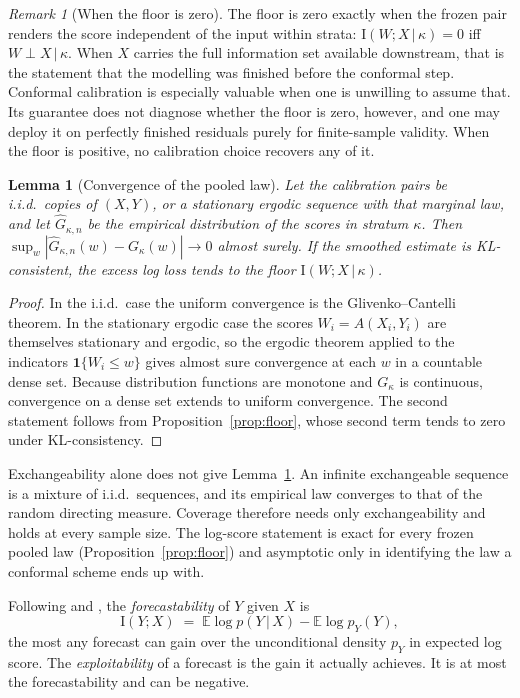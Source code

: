 \documentclass[11pt]{article}
\newtheorem{lemma}[proposition]{Lemma}
\theoremstyle{remark}
\newtheorem{remark}[proposition]{Remark}
\newcommand{\E}{\mathbb{E}}
\newcommand{\I}{\mathrm{I}}
\newcommand{\given}{\,|\,}
\begin{document}
\begin{remark}[When the floor is zero]\label{rem:usecase}
The floor is zero exactly when the frozen pair renders the score independent of
the input within strata: $\I(W;X\given\kappa)=0$ iff $W\perp X\given\kappa$.
When $X$ carries the full information set available downstream, that is the
statement that the modelling was finished before the conformal step. Conformal
calibration is especially valuable when one is unwilling to assume that. Its
guarantee does not diagnose whether the floor is zero, however, and one may deploy
it on perfectly finished residuals purely for finite-sample validity. When the floor is
positive, no calibration choice recovers any of it.
\end{remark}

\begin{lemma}[Convergence of the pooled law]\label{lem:ident}
Let the calibration pairs be i.i.d.\ copies of $(X,Y)$, or a stationary ergodic
sequence with that marginal law, and let $\widehat G_{\kappa,n}$ be the empirical
distribution of the scores in stratum $\kappa$. Then
$\sup_w|\widehat G_{\kappa,n}(w)-G_\kappa(w)|\to0$ almost surely. If the smoothed
estimate is KL-consistent, the excess log loss tends to the floor
$\I(W;X\given\kappa)$.
\end{lemma}

\begin{proof}
In the i.i.d.\ case the uniform convergence is the Glivenko--Cantelli theorem. In
the stationary ergodic case the scores $W_i=A(X_i,Y_i)$ are themselves stationary and
ergodic, so the ergodic theorem applied to the indicators $\mathbf 1\{W_i\le w\}$
gives almost sure convergence at each $w$ in a countable dense set. Because
distribution functions are monotone and $G_\kappa$ is continuous, convergence on a
dense set extends to uniform convergence. The second statement follows from
Proposition~\ref{prop:floor}, whose second term tends to zero under KL-consistency.
\end{proof}

Exchangeability alone does not give Lemma~\ref{lem:ident}. An infinite exchangeable
sequence is a mixture of i.i.d.\ sequences, and its empirical law converges to that of
the random directing measure. Coverage therefore needs only exchangeability and holds
at every sample size. The log-score statement is exact for every frozen pooled law
(Proposition~\ref{prop:floor}) and asymptotic only in identifying the law a conformal
scheme ends up with.

Following \citet{delsole2004} and \citet{catt2026}, the \emph{forecastability} of $Y$
given $X$ is
\[
\I(Y;X)\;=\;\E\log p(Y\given X)-\E\log p_Y(Y),
\]
the most any forecast can gain over the unconditional density $p_Y$ in expected log
score. The \emph{exploitability} of a forecast is the gain it actually achieves. It is
at most the forecastability and can be negative.
\end{document}

